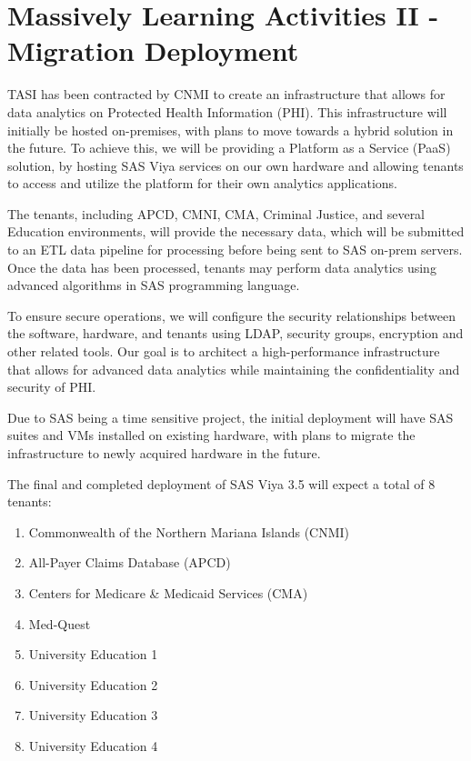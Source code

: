 \section{Massively Learning Activities II - Migration Deployment} \label{section: MLA2}
TASI has been contracted by CNMI to create an infrastructure that allows for data analytics on Protected Health Information (PHI). This infrastructure will initially be hosted on-premises, with plans to move towards a hybrid solution in the future. To achieve this, we will be providing a Platform as a Service (PaaS) solution, by hosting SAS Viya services on our own hardware and allowing tenants to access and utilize the platform for their own analytics applications.

The tenants, including APCD, CMNI, CMA, Criminal Justice, and several Education environments, will provide the necessary data, which will be submitted to an ETL data pipeline for processing before being sent to SAS on-prem servers. Once the data has been processed, tenants may perform data analytics using advanced algorithms in SAS programming language.

To ensure secure operations, we will configure the security relationships between the software, hardware, and tenants using LDAP, security groups, encryption  and other related tools. Our goal is to architect a high-performance infrastructure that allows for advanced data analytics while maintaining the confidentiality and security of PHI.

Due to SAS being a time sensitive project, the initial deployment will have SAS suites and VMs installed on existing hardware, with plans to migrate the infrastructure to newly acquired hardware in the future.

The final and completed deployment of SAS Viya 3.5 will expect a total of 8 tenants:

\begin{enumerate}
    \item Commonwealth of the Northern Mariana Islands (CNMI)
    \item All-Payer Claims Database (APCD)
    \item Centers for Medicare \& Medicaid Services (CMA)
    \item Med-Quest
    \item University Education 1
    \item University Education 2
    \item University Education 3
    \item University Education 4
\end{enumerate}

